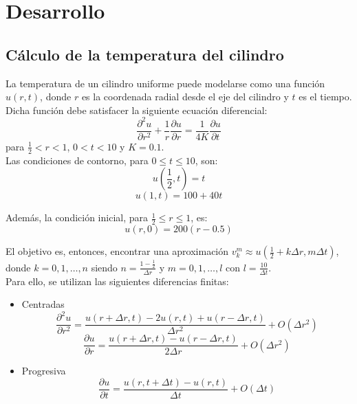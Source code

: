 \documentclass[journal, monochrome]{IEEEtran}
\begin{document}
\section{Desarrollo}
\label{section:development}
\vspace{0.5cm}
\subsection{Cálculo de la temperatura del cilindro}

La temperatura de un cilindro uniforme puede modelarse como una función $u(r,t)$, donde $r$ es la coordenada radial desde el eje del cilindro y $t$ es el tiempo. Dicha función debe satisfacer la siguiente ecuación diferencial:
\begin{equation}
\frac{\partial^{2} u}{\partial r^{2}} + \frac{1}{r} \frac{\partial u}{\partial r} = \frac{1}{4K} \frac{\partial u}{\partial t}
\label{equation:diff}
\end{equation}
para $\frac{1}{2} < r < 1$, $0< t < 10$ y $K = 0.1$. \\

Las condiciones de contorno, para $0 \leq t \leq 10$, son: \\
\begin{equation}
u(\frac{1}{2}, t) = t
\label{equation:contour1}
\end{equation}
\begin{equation}
u(1, t) = 100 + 40t
\label{equation:contour2}
\end{equation}


Además, la condición inicial, para $\frac{1}{2} \leq r \leq 1$, es:
\begin{equation}
u(r, 0) = 200(r-0.5)
\label{equation:initial}
\end{equation}


El objetivo es, entonces, encontrar una aproximación $v_{k}^{m} \approx u(\frac{1}{2} + k\Delta r, m\Delta t)$, donde $k = 0,1,\dots,n$ 
siendo $n = \frac{1-\frac{1}{2}}{\Delta r}$ y $m = 0,1,\dots,l$ con $l = \frac{10}{\Delta t}$. \\

Para ello, se utilizan las siguientes diferencias finitas:
\begin{itemize}
\item Centradas \\
\begin{equation}
\frac{\partial^{2} u}{\partial r^{2}} = \frac{u(r+\Delta r, t) - 2 u(r,t) + u(r-\Delta r,t)}{\Delta r^{2}} + O(\Delta r^{2})
\end{equation}
\begin{equation}
\frac{\partial u}{\partial r} = \frac{u(r+\Delta r, t) - u(r-\Delta r,t)}{2\Delta r} + O(\Delta r^{2})
\end{equation}
\item Progresiva \\
\begin{equation}
\frac{\partial u}{\partial t} = \frac{u(r, t + \Delta t) - u(r,t)}{\Delta t} + O(\Delta t)
\end{equation}
\end{itemize}
\end{document}
